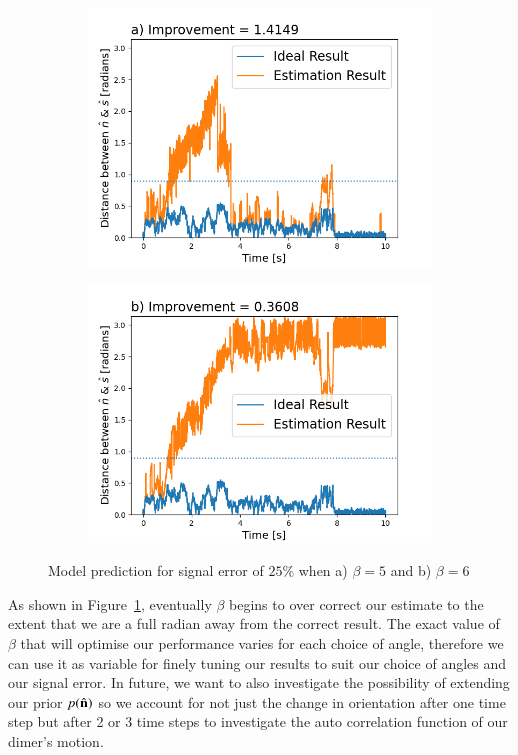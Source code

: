 \documentclass[final, 3p]{elsarticle}
\begin{document}
\begin{figure}[h]
	\centering
	\begin{subfigure}{0.33\textwidth}
		\includegraphics[width=\textwidth]{./Images/fig6a.png}
	\end{subfigure}
	\begin{subfigure}{0.33\textwidth}
		\includegraphics[width=\textwidth]{./Images/fig6b.png}
	\end{subfigure}
	\caption{Model prediction for signal error of $25\%$ when a) $\beta = 5$ and b) $\beta=6$}
	\label{fig:beta}
\end{figure}

As shown in Figure~\ref{fig:beta}, eventually $\beta$ begins to over correct our estimate to the extent that we are a full radian away from the correct result. The exact value of $\beta$ that will optimise our performance varies for each choice of angle, therefore we can use it as variable for finely tuning our results to suit our choice of angles and our signal error.  In future, we want to also investigate the possibility of extending our prior $p(\hat{\bf n})$ so we account for not just the change in orientation after one time step but after 2 or 3 time steps to investigate the auto correlation function of our dimer's motion.
\end{document}
